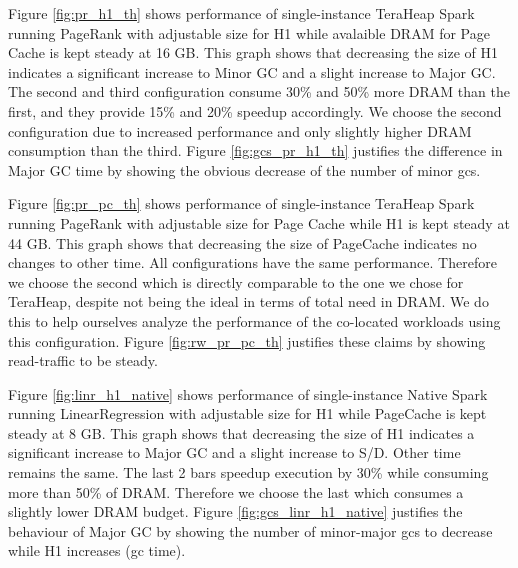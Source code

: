 Figure \ref{fig:pr_h1_th} shows performance of single-instance TeraHeap Spark
running PageRank with adjustable size for H1 while avalaible DRAM for Page Cache is kept
steady at 16 GB. This graph shows that decreasing the size of H1
indicates a significant increase to Minor GC and a slight increase to
Major GC. 
The second and third configuration consume 30\% and 50\% more DRAM than the first,
and they provide 15\% and 20\% speedup accordingly. We choose the second configuration 
due to increased performance and only slightly higher DRAM consumption than the third.
Figure \ref{fig:gcs_pr_h1_th} justifies the difference in Major GC time by showing the obvious
decrease of the number of minor gcs. 

Figure \ref{fig:pr_pc_th} shows performance of
single-instance TeraHeap Spark running PageRank with adjustable size
for Page Cache while H1 is kept steady at 44 GB. This graph shows that
decreasing the size of PageCache indicates no changes to other time.
All configurations have the same performance. Therefore we choose the second
which is directly comparable to the one we chose for TeraHeap, despite not being the ideal in terms
of total need in DRAM. We do this to help ourselves analyze the performance of the co-located workloads using this configuration.
Figure \ref{fig:rw_pr_pc_th} justifies these claims by showing read-traffic to be steady.

Figure \ref{fig:linr_h1_native} shows performance of single-instance
Native Spark running LinearRegression with adjustable size for H1
while PageCache is kept steady at 8 GB. This graph shows that
decreasing the size of H1 indicates a significant increase to Major GC
and a slight increase to S/D. Other time remains the same.
The last 2 bars speedup execution by 30\% while consuming more than 50\% of DRAM.
Therefore we choose the last which consumes a slightly lower DRAM budget.
Figure \ref{fig:gcs_linr_h1_native} justifies the behaviour of Major GC by showing the number of minor-major gcs to decrease
while H1 increases (gc time). 

